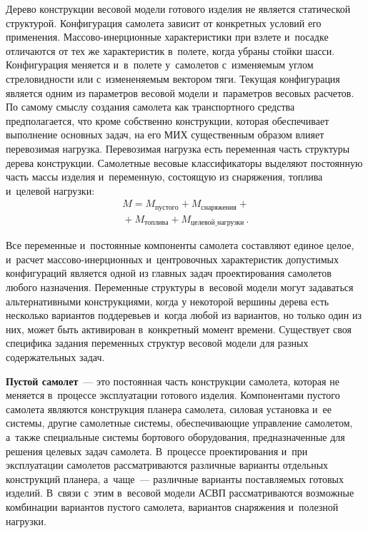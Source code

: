 \begin{multicols}{2}
  Дерево конструкции весовой модели готового изделия не является 
статической структурой. Конфигурация самолета зависит от конкретных 
условий его применения. Мас\-со\-во-инер\-ци\-он\-ные характеристики при 
взлете и~посадке отличаются от тех же характеристик в~полете, когда убраны 
стойки шасси. Конфигурация меняется и~в~полете у~самолетов с~изменяемым 
углом стреловидности или с~измененяемым вектором тяги. Текущая 
конфигурация является одним из параметров весовой модели и~параметров 
весовых расчетов. По самому смыс\-лу создания самолета как транспортного 
средства предполагается, что кроме собственно конструкции, которая 
обеспечивает выполнение основных задач, на его  
МИХ существенным образом влияет 
перевозимая нагрузка. Перевозимая нагрузка есть переменная часть структуры 
дерева конструкции. Самолетные весовые классификаторы выделяют 
постоянную часть массы изделия и~переменную, состоящую из снаряжения, 
топлива и~целевой нагрузки:
  \begin{multline*}
{M} = M_{\mathrm{пустого}} + 
M_{\mathrm{снаряжения}} + {}\\
{}+M_{\mathrm{топлива}} + 
M_{\mathrm{целевой\_нагрузки}}\,.
  \end{multline*}
  
  Все переменные и~постоянные компоненты самолета составляют единое 
целое, и~расчет мас\-со\-во-инер\-ци\-он\-ных и~центровочных характеристик 
допусти\-мых конфигураций является одной из главных задач проектирования 
самолетов любого назначения. Переменные структуры в~весовой модели могут 
задаваться альтернативными конструкциями, когда у некоторой вершины 
дерева есть несколько вариантов поддеревьев и~когда любой из вариантов, но 
только один из них, может быть активирован в~конкретный момент времени. 
Существует своя специфика задания переменных структур весовой модели для 
разных содержательных задач. 
  
  \textbf{Пустой самолет}~--- это постоянная часть конструкции самолета, 
которая не меняется в~процессе эксплуатации готового изделия. Компонентами 
пустого самолета являются конструкция планера самолета, силовая установка 
и~ее системы, другие самолетные системы, обеспечивающие управление 
самолетом, а~также специальные системы бортового оборудования, 
предназначенные для решения целевых задач самолета. В~процессе 
проектирования и~при эксплуатации самолетов рассматриваются различные 
варианты отдельных конструкций планера, а~чаще~--- различные варианты 
по\-став\-ля\-емых готовых изделий. В~связи с~этим в~весовой модели АСВП 
рассматриваются возможные комбинации вариантов пустого самолета, 
вариантов снаряжения и~полезной нагрузки. 


\end{multicols}
